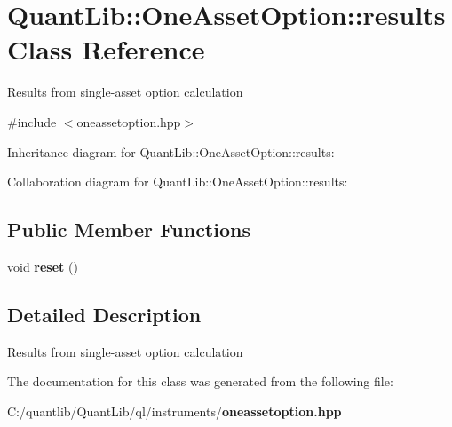 \section{Quant\+Lib\+:\+:One\+Asset\+Option\+:\+:results Class Reference}
\label{class_quant_lib_1_1_one_asset_option_1_1results}


Results from single-\/asset option calculation  




{\ttfamily \#include $<$oneassetoption.\+hpp$>$}



Inheritance diagram for Quant\+Lib\+:\+:One\+Asset\+Option\+:\+:results\+:


Collaboration diagram for Quant\+Lib\+:\+:One\+Asset\+Option\+:\+:results\+:
\subsection*{Public Member Functions}
\begin{DoxyCompactItemize}
\item 
void {\bfseries reset} ()\label{class_quant_lib_1_1_one_asset_option_1_1results_af4dcc2b4db1dd0ae5afe29681a995b60}

\end{DoxyCompactItemize}


\subsection{Detailed Description}
Results from single-\/asset option calculation 

The documentation for this class was generated from the following file\+:\begin{DoxyCompactItemize}
\item 
C\+:/quantlib/\+Quant\+Lib/ql/instruments/{\bf oneassetoption.\+hpp}\end{DoxyCompactItemize}
